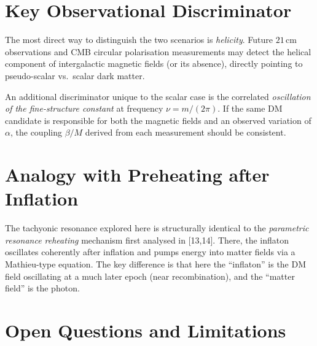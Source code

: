 \documentclass[12pt,a4paper,openany]{book}
\begin{document}
\section{Key Observational Discriminator}

The most direct way to distinguish the two scenarios is \emph{helicity}. Future $21\,\mathrm{cm}$ observations and CMB circular polarisation measurements may detect the helical component of intergalactic magnetic fields (or its absence), directly pointing to pseudo-scalar vs.\ scalar dark matter.

An additional discriminator unique to the scalar case is the correlated \emph{oscillation of the fine-structure constant} at frequency $\nu = m/(2\pi)$. If the same DM candidate is responsible for both the magnetic fields and an observed variation of $\alpha$, the coupling $\beta/M$ derived from each measurement should be consistent.

\section{Analogy with Preheating after Inflation}

The tachyonic resonance explored here is structurally identical to the \emph{parametric resonance reheating} mechanism first analysed in [13,14]. There, the inflaton oscillates coherently after inflation and pumps energy into matter fields via a Mathieu-type equation. The key difference is that here the ``inflaton'' is the DM field oscillating at a much later epoch (near recombination), and the ``matter field'' is the photon.

\section{Open Questions and Limitations}
\end{document}
